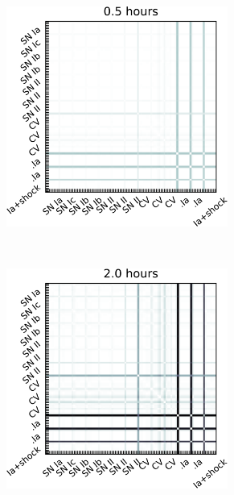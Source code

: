\begin{figure}[hbt]
\centering
    \begin{subfigure}[t]{0.45\textwidth}
        \centering
        \includegraphics[width=0.8\textwidth]{figs/transients/TransientsAgeSimilarity1.pdf}
    \end{subfigure}%
    ~
    \begin{subfigure}[t]{0.45\textwidth}
        \centering
        \includegraphics[width=0.8\textwidth]{figs/transients/TransientsAgeSimilarity2.pdf}
    \end{subfigure}



\end{figure}

